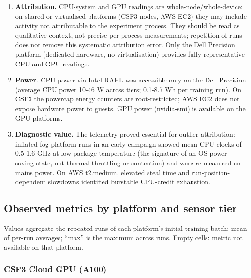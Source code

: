 \documentclass[
  9pt, a4paper, landscape]{article}
\providecommand{\tightlist}{%
  \setlength{\itemsep}{0pt}\setlength{\parskip}{0pt}}
\begin{document}
\begin{enumerate}
\def\labelenumi{\arabic{enumi}.}
\tightlist
\item
  \textbf{Attribution.} CPU-system and GPU readings are whole-node/whole-device: on shared or virtualised platforms (CSF3 nodes, AWS EC2) they may include activity not attributable to the experiment process. They should be read as qualitative context, not precise per-process measurements; repetition of runs does not remove this systematic attribution error. Only the Dell Precision platform (dedicated hardware, no virtualisation) provides fully representative CPU and GPU readings.
\item
  \textbf{Power.} CPU power via Intel RAPL was accessible only on the Dell Precision (average CPU power 10-46 W across tiers; 0.1-8.7 Wh per training run). On CSF3 the powercap energy counters are root-restricted; AWS EC2 does not expose hardware power to guests. GPU power (nvidia-smi) is available on the GPU platforms.
\item
  \textbf{Diagnostic value.} The telemetry proved essential for outlier attribution: inflated fog-platform runs in an early campaign showed mean CPU clocks of 0.5-1.6 GHz at low package temperature (the signature of an OS power-saving state, not thermal throttling or contention) and were re-measured on mains power. On AWS t2.medium, elevated steal time and run-position-dependent slowdowns identified burstable CPU-credit exhaustion.
\end{enumerate}

\hypertarget{observed-metrics-by-platform-and-sensor-tier}{%
\subsection{Observed metrics by platform and sensor
tier}\label{observed-metrics-by-platform-and-sensor-tier}}

Values aggregate the repeated runs of each platform's initial-training batch: mean of per-run averages; ``max'' is the maximum across runs. Empty cells: metric not available on that platform.

\hypertarget{csf3-cloud-gpu-a100}{%
\subsubsection{CSF3 Cloud GPU (A100)}\label{csf3-cloud-gpu-a100}}
\end{document}
